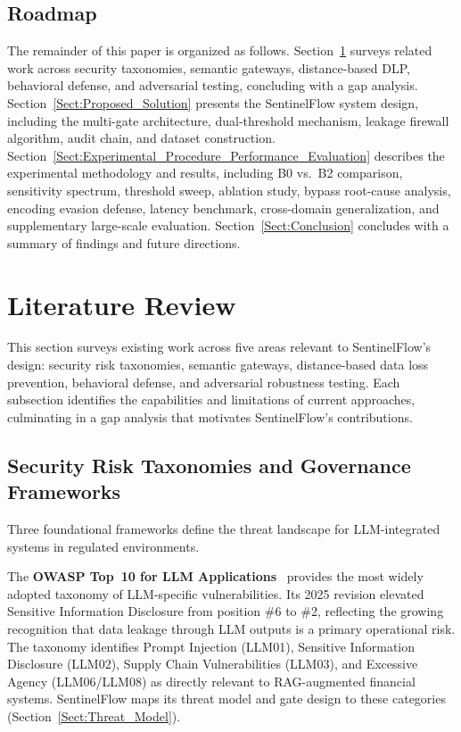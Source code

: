 \documentclass[journal]{IEEEtran}
\begin{document}
\subsection{Roadmap}
\label{Sect:Roadmap}

The remainder of this paper is organized as follows. Section~\ref{Sect:Literature_Review} surveys related work across security taxonomies, semantic gateways, distance-based DLP, behavioral defense, and adversarial testing, concluding with a gap analysis. Section~\ref{Sect:Proposed_Solution} presents the SentinelFlow system design, including the multi-gate architecture, dual-threshold mechanism, leakage firewall algorithm, audit chain, and dataset construction. Section~\ref{Sect:Experimental_Procedure_Performance_Evaluation} describes the experimental methodology and results, including B0 vs.\ B2 comparison, sensitivity spectrum, threshold sweep, ablation study, bypass root-cause analysis, encoding evasion defense, latency benchmark, cross-domain generalization, and supplementary large-scale evaluation. Section~\ref{Sect:Conclusion} concludes with a summary of findings and future directions.

\section{Literature Review}
\label{Sect:Literature_Review}
%

This section surveys existing work across five areas relevant to SentinelFlow's design: security risk taxonomies, semantic gateways, distance-based data loss prevention, behavioral defense, and adversarial robustness testing. Each subsection identifies the capabilities and limitations of current approaches, culminating in a gap analysis that motivates SentinelFlow's contributions.

\subsection{Security Risk Taxonomies and Governance Frameworks}
\label{Sect:LR_Taxonomies}

Three foundational frameworks define the threat landscape for LLM-integrated systems in regulated environments.

The \textbf{OWASP Top~10 for LLM Applications}~\cite{owasp_llm_2025} provides the most widely adopted taxonomy of LLM-specific vulnerabilities. Its 2025 revision elevated Sensitive Information Disclosure from position \#6 to \#2, reflecting the growing recognition that data leakage through LLM outputs is a primary operational risk. The taxonomy identifies Prompt Injection (LLM01), Sensitive Information Disclosure (LLM02), Supply Chain Vulnerabilities (LLM03), and Excessive Agency (LLM06/LLM08) as directly relevant to RAG-augmented financial systems. SentinelFlow maps its threat model and gate design to these categories (Section~\ref{Sect:Threat_Model}).
\end{document}
